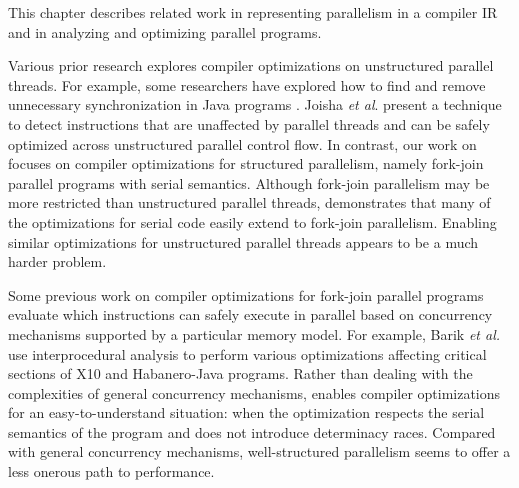 
This chapter describes related work in representing parallelism in a
compiler IR and in analyzing and optimizing parallel programs.

Various prior research explores compiler optimizations on unstructured
parallel threads.  For example, some researchers have explored how to
find and remove unnecessary synchronization in Java programs
\cite{AldrichChSi99, Ruf00}.  Joisha \textit{et al}.\@
\cite{JoishaScBa11} present a technique to detect instructions that
are unaffected by parallel threads and can be safely optimized across
unstructured parallel control flow.  In contrast, our work on \tapir
focuses on compiler optimizations for structured parallelism, namely
fork-join parallel programs with serial semantics.  Although fork-join
parallelism may be more restricted than unstructured parallel threads,
\tapir demonstrates that many of the optimizations for serial code
easily extend to fork-join parallelism.  Enabling similar
optimizations for unstructured parallel threads appears to be a much
harder problem.

Some previous work on compiler optimizations for fork-join parallel
programs evaluate which instructions can safely execute in parallel
\cite{AgarwalBaSa07} based on concurrency mechanisms supported by a
particular memory model.  For example, Barik \textit{et al.}\@
\cite{BarikSa09, BarikZhSa13} use interprocedural analysis to perform
various optimizations affecting critical sections of X10 and
Habanero-Java programs.  Rather than dealing with the complexities of
general concurrency mechanisms, \tapir enables compiler optimizations
for an easy-to-understand situation: when the optimization respects
the serial semantics of the program and does not introduce determinacy
races.  Compared with general concurrency mechanisms, well-structured
parallelism seems to offer a less onerous path to performance.



